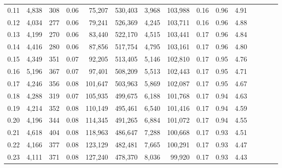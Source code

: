 \begin{tabular}{rrrcrrrrrrrrrrr}
0.11 &   4,838 &    308 &                                       0.06 &   75,207 &  530,403 &    3,968 &  103,988 &  0.16 &  0.96 &                         4.91 \\
0.12 &   4,034 &    277 &                                       0.06 &   79,241 &  526,369 &    4,245 &  103,711 &  0.16 &  0.96 &                         4.88 \\
0.13 &   4,199 &    270 &                                       0.06 &   83,440 &  522,170 &    4,515 &  103,441 &  0.17 &  0.96 &                         4.84 \\
0.14 &   4,416 &    280 &                                       0.06 &   87,856 &  517,754 &    4,795 &  103,161 &  0.17 &  0.96 &                         4.80 \\
0.15 &   4,349 &    351 &                                       0.07 &   92,205 &  513,405 &    5,146 &  102,810 &  0.17 &  0.95 &                         4.76 \\
0.16 &   5,196 &    367 &                                       0.07 &   97,401 &  508,209 &    5,513 &  102,443 &  0.17 &  0.95 &                         4.71 \\
0.17 &   4,246 &    356 &                                       0.08 &  101,647 &  503,963 &    5,869 &  102,087 &  0.17 &  0.95 &                         4.67 \\
0.18 &   4,288 &    319 &                                       0.07 &  105,935 &  499,675 &    6,188 &  101,768 &  0.17 &  0.94 &                         4.63 \\
0.19 &   4,214 &    352 &                                       0.08 &  110,149 &  495,461 &    6,540 &  101,416 &  0.17 &  0.94 &                         4.59 \\
0.20 &   4,196 &    344 &                                       0.08 &  114,345 &  491,265 &    6,884 &  101,072 &  0.17 &  0.94 &                         4.55 \\
0.21 &   4,618 &    404 &                                       0.08 &  118,963 &  486,647 &    7,288 &  100,668 &  0.17 &  0.93 &                         4.51 \\
0.22 &   4,166 &    377 &                                       0.08 &  123,129 &  482,481 &    7,665 &  100,291 &  0.17 &  0.93 &                         4.47 \\
0.23 &   4,111 &    371 &                                       0.08 &  127,240 &  478,370 &    8,036 &   99,920 &  0.17 &  0.93 &                         4.43 \\

\end{tabular}
